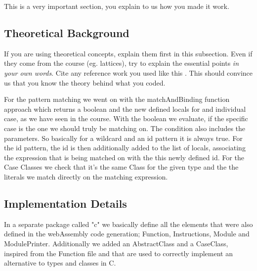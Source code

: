 This is a very important section, you explain to us how you made it work.

\subsection{Theoretical Background}
If you are using theoretical concepts, explain them first in this subsection.
Even if they come from the course (eg. lattices), try to explain the essential
points \emph{in your own words}. Cite any reference work you used like this
\cite{TigerBook}. This should convince us that you know the theory behind what
you coded.

For the pattern matching we went on with the matchAndBinding function approach which returns a boolean and the new defined locals for and individual case, as we have seen in the course.
With the boolean we evaluate, if the specific case is the one we should truly be matching on.
The condition also includes the parameters. So basically for a wildcard and an id pattern it is always true.
For the id pattern, the id is then additionally added to the list of locals, associating the expression that is being matched on with the this newly defined id.
For the Case Classes we check that it's the same Class for the given type and the the literals we match directly on the matching expression.

\subsection{Implementation Details}
%
In a separate package called "c" we basically define all the elements that were also defined in the webAssembly code generation; Function, Instructions, Module and ModulePrinter.
Additionally we added an AbstractClass and a CaseClass, inspired from the Function file and that are used to correctly implement an alternative to types and classes in C.

